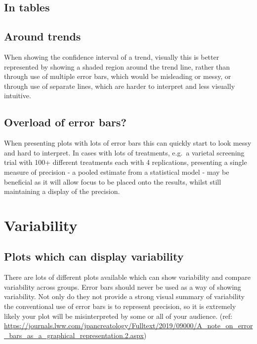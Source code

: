 \documentclass[
  titlepage]{book}
\begin{document}
\hypertarget{in-tables}{%
\subsection{In tables}\label{in-tables}}

\hypertarget{around-trends}{%
\subsection{Around trends}\label{around-trends}}

When showing the confidence interval of a trend, visually this is better represented by showing a shaded region around the trend line, rather than through use of multiple error bars, which would be misleading or messy, or through use of separate lines, which are harder to interpret and less visually intuitive.

\hypertarget{overload-of-error-bars}{%
\subsection{Overload of error bars?}\label{overload-of-error-bars}}

When presenting plots with lots of error bars this can quickly start to look messy and hard to interpret. In cases with lots of treatments, e.g.~a varietal screening trial with 100+ different treatments each with 4 replications, presenting a single measure of precision - a pooled estimate from a statistical model - may be beneficial as it will allow focus to be placed onto the results, whilst still maintaining a display of the precision.

\hypertarget{variability}{%
\section{Variability}\label{variability}}

\hypertarget{plots-which-can-display-variability}{%
\subsection{Plots which can display variability}\label{plots-which-can-display-variability}}

There are lots of different plots available which can show variability and compare variability across groups. Error bars should never be used as a way of showing variability. Not only do they not provide a strong visual summary of variability the conventional use of error bars is to represent precision, so it is extremely likely your plot will be misinterpreted by some or all of your audience. (ref: \url{https://journals.lww.com/jpancreatology/Fulltext/2019/09000/A_note_on_error_bars_as_a_graphical_representation.2.aspx})
\end{document}
